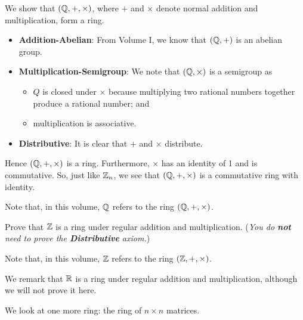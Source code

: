 \begin{example}
    We show that $(\mathbb{Q}, +, \times)$, where $+$ and $\times$ denote normal addition and multiplication, form a ring.
    \begin{itemize}
        \item \textbf{Addition-Abelian}: From Volume I, we know that $(\mathbb{Q}, +)$ is an abelian group.
        \item \textbf{Multiplication-Semigroup}: We note that $(\mathbb{Q}, \times)$ is a semigroup as
        \begin{itemize}
            \item $Q$ is closed under $\times$ because multiplying two rational numbers together produce a rational number; and
            \item multiplication is associative.
        \end{itemize}
        \item \textbf{Distributive}: It is clear that $+$ and $\times$ distribute.
    \end{itemize}
    Hence $(\mathbb{Q}, +, \times)$ is a ring. Furthermore, $\times$ has an identity of 1 and is commutative. So, just like $\mathbb{Z}_n$, we see that $(\mathbb{Q}, +, \times)$ is a commutative ring with identity.

    Note that, in this volume, $\mathbb{Q}$ refers to the ring $(\mathbb{Q}, +, \times)$.
\end{example}

\begin{exercise}
    Prove that $\mathbb{Z}$ is a ring under regular addition and multiplication.\newline
    (\textit{You do \textbf{not} need to prove the \textbf{Distributive} axiom.})
\end{exercise}
Note that, in this volume, $\mathbb{Z}$ refers to the ring $(\mathbb{Z}, +, \times)$.

We remark that $\mathbb{R}$ is a ring under regular addition and multiplication, although we will not prove it here.

We look at one more ring: the ring of $n \times n$ matrices.

